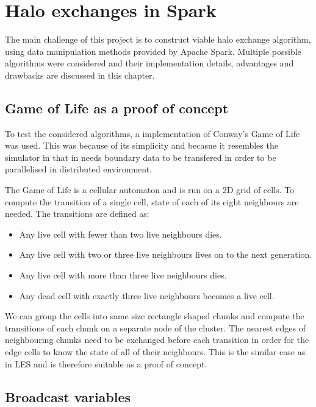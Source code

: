 \documentclass{l4proj}
\begin{document}
\chapter{Halo exchanges in Spark}
\label{chap:halos}

The main challenge of this project is to construct viable halo exchange algorithm, using 
data manipulation methods provided by Apache Spark. Multiple possible algorithms were 
considered and their implementation details, advantages and drawbacks are discussed in this chapter.

\section{Game of Life as a proof of concept}
To test the considered algorithms, a implementation of Conway's Game of Life was used.
This was because of its simplicity and becasue it resembles the simulator in that
in needs boundary data to be transfered in order to be parallelised in 
distributed environment.

The Game of Life is a cellular automaton and is run on a 2D grid of cells. To compute
the transition of a single cell, state of each of its eight neighbours are needed.
The transitions are defined as:

\begin{itemize} 
\item Any live cell with fewer than two live neighbours dies.
\item Any live cell with two or three live neighbours lives on to the next generation.
\item Any live cell with more than three live neighbours dies.
\item Any dead cell with exactly three live neighbours becomes a live cell.
\end{itemize}

We can group the cells into same size rectangle shaped chunks and compute the transitions of each
chunk on a separate node of the cluster. The nearest edges of neighbouring
chunks need to be exchanged before each transition in order for the edge cells to know
the state of all of their neighbours. This is the similar case as in LES and is therefore
suitable as a proof of concept.

\section{Broadcast variables}
\label{chap:broadcast}
\end{document}
